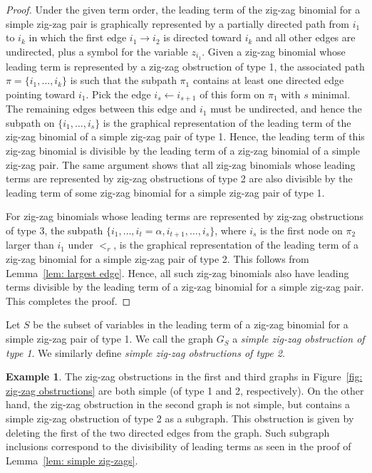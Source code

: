 \documentclass[11pt]{article}
\theoremstyle{definition}
\newtheorem{example}[theo]{Example}
\numberwithin{equation}{section}
\begin{document}
\begin{proof}
Under the given term order, the leading term of the zig-zag binomial for a simple zig-zag pair is graphically represented by a partially directed path from $i_1$ to $i_k$ in which the first edge $i_1 \rightarrow i_2$ is directed toward $i_k$ and all other edges are undirected, plus a symbol for the variable $z_{i_1}$.
Given a zig-zag binomial whose leading term is represented by a zig-zag obstruction of type 1, the associated path $\pi = \{i_1,\ldots, i_k\}$ is such that the subpath $\pi_1$ contains at least one directed edge pointing toward $i_1$.  
Pick the edge $i_s\leftarrow i_{s+1}$ of this form on $\pi_1$ with $s$ minimal.  
The remaining edges between this edge and $i_1$ must be undirected, and hence the subpath on $\{i_1,\ldots, i_s\}$ is the graphical representation of the leading term of the zig-zag binomial of a simple zig-zag pair of type 1.
Hence, the leading term of this zig-zag binomial is divisible by the leading term of a zig-zag binomial of a simple zig-zag pair. 
The same argument shows that all zig-zag binomials whose leading terms are represented by zig-zag obstructions of type 2 are also divisible by the leading term of some zig-zag binomial for a simple zig-zag pair of type 1. 

For zig-zag binomials whose leading terms are represented by zig-zag obstructions of type 3, the subpath $\{i_1,\ldots, i_t = \alpha, i_{t+1},\ldots, i_s\}$, where $i_s$ is the first node on $\pi_2$ larger than $i_1$ under $<_r$, is the graphical representation of the leading term of a zig-zag binomial for a simple zig-zag pair of type 2. 
This follows from Lemma~\ref{lem: largest edge}. 
Hence, all such zig-zag binomials also have leading terms divisible by the leading term of a zig-zag binomial for a simple zig-zag pair. 
This completes the proof. 
\end{proof}

Let $S$ be the subset of variables in the leading term of a zig-zag binomial for a simple zig-zag pair of type 1.  
We call the graph $G_S$ a \emph{simple zig-zag obstruction of type 1}. 
We similarly define \emph{simple zig-zag obstructions of type 2}.

\begin{example}
    \label{ex: simple zig-zags}
The zig-zag obstructions in the first and third graphs in Figure~\ref{fig: zig-zag obstructions} are both simple (of type 1 and 2, respectively).  
On the other hand, the zig-zag obstruction in the second graph is not simple, but contains a simple zig-zag obstruction of type 2 as a subgraph.  
This obstruction is given by deleting the first of the two directed edges from the graph.  
Such subgraph inclusions correspond to the divisibility of leading terms as seen in the proof of Lemma~\ref{lem: simple zig-zags}.
\end{example}
\end{document}
